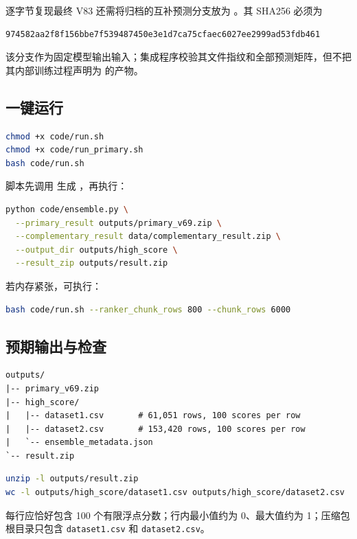 \documentclass[UTF8,a4paper,11pt]{ctexart}
\begin{document}
逐字节复现最终 V83 还需将归档的互补预测分支放为 。其 SHA256 必须为
\begin{lstlisting}
974582aa2f8f156bbe7f539487450e3e1d7ca75cfaec6027ee2999ad53fdb461
\end{lstlisting}
该分支作为固定模型输出输入；集成程序校验其文件指纹和全部预测矩阵，但不把其内部训练过程声明为  的产物。

\subsection{一键运行}

\begin{lstlisting}[language=bash]
chmod +x code/run.sh
chmod +x code/run_primary.sh
bash code/run.sh
\end{lstlisting}

脚本先调用  生成 ，再执行：

\begin{lstlisting}[language=bash]
python code/ensemble.py \
  --primary_result outputs/primary_v69.zip \
  --complementary_result data/complementary_result.zip \
  --output_dir outputs/high_score \
  --result_zip outputs/result.zip
\end{lstlisting}

若内存紧张，可执行：

\begin{lstlisting}[language=bash]
bash code/run.sh --ranker_chunk_rows 800 --chunk_rows 6000
\end{lstlisting}

\subsection{预期输出与检查}

\begin{lstlisting}
outputs/
|-- primary_v69.zip
|-- high_score/
|   |-- dataset1.csv       # 61,051 rows, 100 scores per row
|   |-- dataset2.csv       # 153,420 rows, 100 scores per row
|   `-- ensemble_metadata.json
`-- result.zip
\end{lstlisting}

\begin{lstlisting}[language=bash]
unzip -l outputs/result.zip
wc -l outputs/high_score/dataset1.csv outputs/high_score/dataset2.csv
\end{lstlisting}

每行应恰好包含 100 个有限浮点分数；行内最小值约为 0、最大值约为 1；压缩包根目录只包含 \texttt{dataset1.csv} 和 \texttt{dataset2.csv}。
\end{document}
